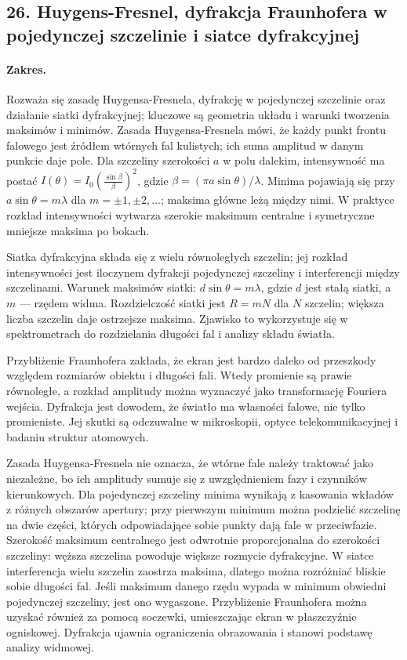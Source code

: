 \documentclass[11pt,a4paper]{article}
\begin{document}
\subsection{26. Huygens-Fresnel, dyfrakcja Fraunhofera w pojedynczej szczelinie i siatce dyfrakcyjnej}
\paragraph{Zakres.} Rozważa się zasadę Huygensa-Fresnela, dyfrakcję w pojedynczej szczelinie oraz działanie siatki dyfrakcyjnej; kluczowe są geometria układu i warunki tworzenia maksimów i minimów. Zasada Huygensa-Fresnela mówi, że każdy punkt frontu falowego jest źródłem wtórnych fal kulistych; ich suma amplitud w danym punkcie daje pole. Dla szczeliny szerokości $a$ w polu dalekim, intensywność ma postać $I(\theta)=I_0\left(\frac{\sin\beta}{\beta}\right)^2$, gdzie $\beta=(\pi a\sin\theta)/\lambda$. Minima pojawiają się przy $a\sin\theta = m\lambda$ dla $m=\pm1,\pm2,\ldots$; maksima główne leżą między nimi. W praktyce rozkład intensywności wytwarza szerokie maksimum centralne i symetryczne mniejsze maksima po bokach.\par
Siatka dyfrakcyjna składa się z wielu równoległych szczelin; jej rozkład intensywności jest iloczynem dyfrakcji pojedynczej szczeliny i interferencji między szczelinami. Warunek maksimów siatki: $d\sin\theta = m\lambda$, gdzie $d$ jest stałą siatki, a $m$ — rzędem widma. Rozdzielczość siatki jest $R=mN$ dla $N$ szczelin; większa liczba szczelin daje ostrzejsze maksima. Zjawisko to wykorzystuje się w spektrometrach do rozdzielania długości fal i analizy składu światła.\par
Przybliżenie Fraunhofera zakłada, że ekran jest bardzo daleko od przeszkody względem rozmiarów obiektu i długości fali. Wtedy promienie są prawie równoległe, a rozkład amplitudy można wyznaczyć jako transformację Fouriera wejścia. Dyfrakcja jest dowodem, że światło ma własności falowe, nie tylko promieniste. Jej skutki są odczuwalne w mikroskopii, optyce telekomunikacyjnej i badaniu struktur atomowych.\par

Zasada Huygensa-Fresnela nie oznacza, że wtórne fale należy traktować jako niezależne, bo ich amplitudy sumuje się z uwzględnieniem fazy i czynników kierunkowych. Dla pojedynczej szczeliny minima wynikają z kasowania wkładów z różnych obszarów apertury; przy pierwszym minimum można podzielić szczelinę na dwie części, których odpowiadające sobie punkty dają fale w przeciwfazie. Szerokość maksimum centralnego jest odwrotnie proporcjonalna do szerokości szczeliny: węższa szczelina powoduje większe rozmycie dyfrakcyjne. W siatce interferencja wielu szczelin zaostrza maksima, dlatego można rozróżniać bliskie sobie długości fal. Jeśli maksimum danego rzędu wypada w minimum obwiedni pojedynczej szczeliny, jest ono wygaszone. Przybliżenie Fraunhofera można uzyskać również za pomocą soczewki, umieszczając ekran w płaszczyźnie ogniskowej. Dyfrakcja ujawnia ograniczenia obrazowania i stanowi podstawę analizy widmowej.
\par
\end{document}
